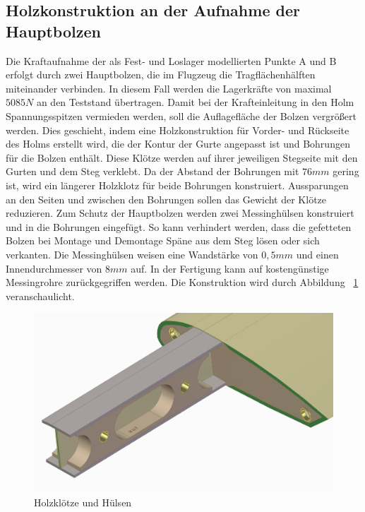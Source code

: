\subsection{Holzkonstruktion an der Aufnahme der Hauptbolzen}
Die Kraftaufnahme der  als Fest- und Loslager modellierten Punkte A und B erfolgt durch zwei Hauptbolzen, die im Flugzeug die Tragflächenhälften miteinander verbinden. In diesem Fall werden die Lagerkräfte von maximal $ 5085N $ an den Teststand übertragen. Damit bei der Krafteinleitung in den Holm Spannungsspitzen vermieden werden, soll die Auflagefläche der Bolzen vergrößert werden. Dies geschieht, indem eine Holzkonstruktion für Vorder- und Rückseite des Holms erstellt wird, die der Kontur der Gurte angepasst ist und Bohrungen für die Bolzen enthält. Diese Klötze werden auf ihrer jeweiligen Stegseite mit den Gurten und dem Steg verklebt. Da der Abstand der Bohrungen mit $ 76mm $ gering ist, wird ein längerer Holzklotz für beide Bohrungen konstruiert. Aussparungen an den Seiten und zwischen den Bohrungen sollen das Gewicht der Klötze reduzieren. Zum Schutz der Hauptbolzen werden zwei Messinghülsen konstruiert und in die Bohrungen eingefügt. So kann verhindert werden, dass die gefetteten Bolzen bei Montage und Demontage Späne aus dem Steg lösen oder sich verkanten. Die Messinghülsen weisen eine Wandstärke von $ 0,5mm $ und einen Innendurchmesser von $ 8mm $ auf. In der Fertigung kann auf kostengünstige Messingrohre zurückgegriffen werden. Die Konstruktion wird durch Abbildung ~\ref{fig: Klotz} veranschaulicht.
\begin{figure}[h]
	\includegraphics[width=1.0\textwidth]{Bilder/Klotz.jpg}
	\caption{Holzklötze und Hülsen}
	\label{fig: Klotz}
\end{figure}

